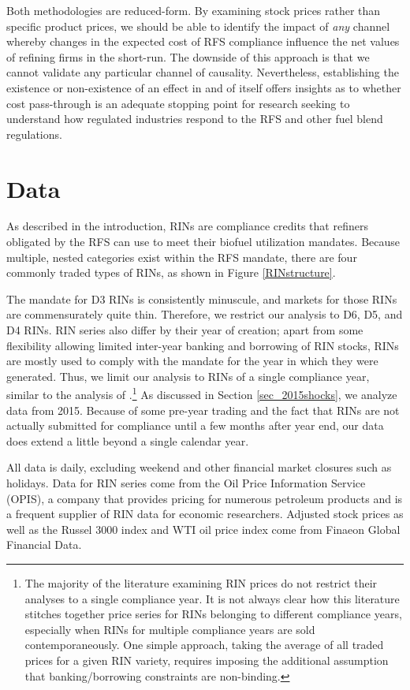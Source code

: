 \documentclass[11pt]{article}
\begin{document}
Both methodologies are reduced-form. By examining stock prices rather than specific product prices, we should be able to identify the impact of \textit{any} channel whereby changes in the expected cost of RFS compliance influence the net values of refining firms in the short-run. The downside of this approach is that we cannot validate any particular channel of causality. Nevertheless, establishing the existence or non-existence of an effect in and of itself offers insights as to whether cost pass-through is an adequate stopping point for research seeking to understand how regulated industries respond to the RFS and other fuel blend regulations.

\section{Data}

As described in the introduction, RINs are compliance credits that refiners obligated by the RFS can use to meet their biofuel utilization mandates. Because multiple, nested categories exist within the RFS mandate, there are four commonly traded types of RINs, as shown in Figure \ref{RINstructure}.

The mandate for D3 RINs is consistently minuscule, and markets for those RINs are commensurately quite thin. Therefore, we restrict our analysis to D6, D5, and D4 RINs. RIN series also differ by their year of creation; apart from some flexibility allowing limited inter-year banking and borrowing of RIN stocks, RINs are mostly used to comply with the mandate for the year in which they were generated. Thus, we limit our analysis to RINs of a single compliance year, similar to the analysis of \cite{Lade2018a}.\footnote{The majority of the literature examining RIN prices do not restrict their analyses to a single compliance year. It is not always clear how this literature stitches together price series for RINs belonging to different compliance years, especially when RINs for multiple compliance years are sold contemporaneously. One simple approach, taking the average of all traded prices for a given RIN variety, requires imposing the additional assumption that banking/borrowing constraints are non-binding.} As discussed in Section \ref{sec_2015shocks}, we analyze data from 2015. Because of some pre-year trading and the fact that RINs are not actually submitted for compliance until a few months after year end, our data does extend a little beyond a single calendar year. 

All data is daily, excluding weekend and other financial market closures such as holidays. Data for RIN series come from the Oil Price Information Service (OPIS), a company that provides pricing for numerous petroleum products and is a frequent supplier of RIN data for economic researchers. Adjusted stock prices as well as the Russel 3000 index and WTI oil price index come from Finaeon Global Financial Data.
\end{document}
